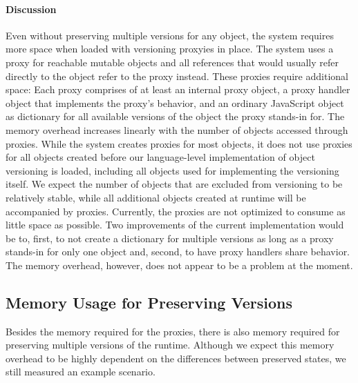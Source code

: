 \paragraph{Discussion}
Even without preserving multiple versions for any object, the system requires more space when loaded with versioning proxyies in place.
The system uses a proxy for reachable mutable objects and all references that would usually refer directly to the object refer to the proxy instead.
These proxies require additional space: Each proxy comprises of at least an internal proxy object, a proxy handler object that implements the proxy's behavior, and an ordinary JavaScript object as dictionary for all available versions of the object the proxy stands-in for.
The memory overhead increases linearly with the number of objects accessed through proxies.
While the system creates proxies for most objects, it does not use proxies for all objects created before our language-level implementation of object versioning is loaded, including all objects used for implementing the versioning itself.
We expect the number of objects that are excluded from versioning to be relatively stable, while all additional objects created at runtime will be accompanied by proxies.
Currently, the proxies are not optimized to consume as little space as possible.
Two improvements of the current implementation would be to, first, to not create a dictionary for multiple versions as long as a proxy stands-in for only one object and, second, to have proxy handlers share behavior.
The memory overhead, however, does not appear to be a problem at the moment.


\subsection{Memory Usage for Preserving Versions}

Besides the memory required for the proxies, there is also memory required for preserving multiple versions of the runtime.
Although we expect this memory overhead to be highly dependent on the differences between preserved states, we still measured an example scenario.

